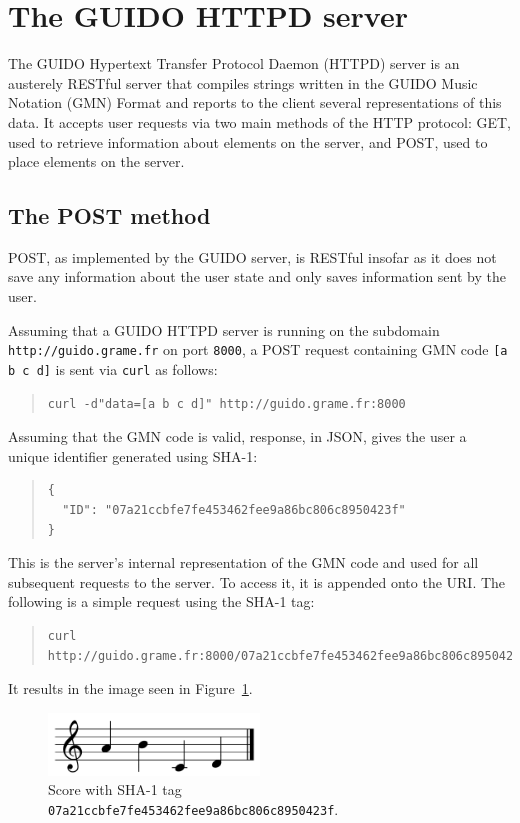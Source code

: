 \documentclass[a4paper]{article}
\begin{document}
\section{The GUIDO HTTPD server}
The GUIDO Hypertext Transfer Protocol Daemon (HTTPD) server is an austerely RESTful server that compiles strings written in the GUIDO Music Notation (GMN) Format and reports to the client several representations of this data.  It accepts user requests via two main methods of the HTTP protocol: GET, used to retrieve information about elements on the server, and POST, used to place elements on the server.
\subsection{The POST method}
POST, as implemented by the GUIDO server, is RESTful insofar as it does not save any information about the user state and only saves information sent by the user.\par
Assuming that a GUIDO HTTPD server is running on the subdomain \break \verb=http://guido.grame.fr= on port \verb=8000=, a POST request containing GMN code \verb=[a b c d]= is sent via \verb=curl= as follows:
\begin{quote}
\begin{verbatim}
curl -d"data=[a b c d]" http://guido.grame.fr:8000
\end{verbatim}
\end{quote}
Assuming that the GMN code is valid, response, in JSON, gives the user a unique identifier generated using SHA-1:
\begin{quote}
\begin{verbatim}
{
  "ID": "07a21ccbfe7fe453462fee9a86bc806c8950423f"
}
\end{verbatim}
\end{quote}
This is the server's internal representation of the GMN code and used for all subsequent requests to the server.  To access it, it is appended onto the URI.  The following is a simple request using the SHA-1 tag:
\begin{quote}
\begingroup
\fontsize{7.5pt}{12pt}\selectfont
\begin{verbatim}
curl http://guido.grame.fr:8000/07a21ccbfe7fe453462fee9a86bc806c8950423f
\end{verbatim}
\endgroup
\end{quote}
It results in the image seen in Figure~\ref{fig:figure1}.
\begin{figure}[h]
  \centering
    \includegraphics[width=0.5\textwidth]{figure1}
  \cprotect\caption{\label{fig:figure1}Score with SHA-1 tag \verb=07a21ccbfe7fe453462fee9a86bc806c8950423f=.}
\end{figure}
\end{document}

